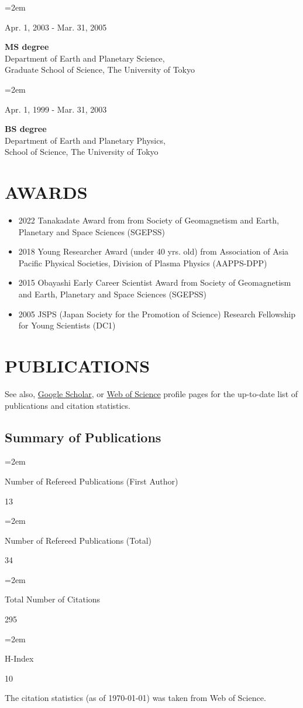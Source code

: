 \documentclass[lualatex,a4paper,ja=standard]{scrartcl}
\newcommand{\NewPart}[2]{\section*{\uppercase{#1} #2}}
\newcommand{\NewSubPart}[1]{\subsection*{#1}}
\newcommand{\GeneralEntry}[4]{
\noindent\hangindent=2em\hangafter=0
\parbox{#1}{#3}
\hspace{1em}
\parbox{#2}{#4} \par
\vspace{0.5em}
}
\begin{document}
\GeneralEntry{14em}{28em}{Apr. 1, 2003 - Mar. 31, 2005}
{\textbf{MS degree}\\
	Department of Earth and Planetary Science,\\
	Graduate School of Science, The University of Tokyo}


\GeneralEntry{14em}{28em}{Apr. 1, 1999 - Mar. 31, 2003}
{\textbf{BS degree}\\
	Department of Earth and Planetary Physics,\\
	School of Science, The University of Tokyo}


\NewPart{Awards}{}
\begin{itemize}
	\item 2022 Tanakadate Award from from Society of Geomagnetism and Earth, Planetary and Space Sciences (SGEPSS)
	\item 2018 Young Researcher Award (under 40 yrs. old) from Association of Asia Pacific Physical Societies, Division of Plasma Physics (AAPPS-DPP)
	\item 2015 Obayashi Early Career Scientist Award from Society of Geomagnetism and Earth, Planetary and Space Sciences (SGEPSS)
	\item 2005 JSPS (Japan Society for the Promotion of Science) Research Fellowship for Young Scientists (DC1)
\end{itemize}


\clearpage
\NewPart{Publications}{}

See also,
\href{https://scholar.google.co.jp/citations?hl=ja&user=o23rFB8AAAAJ&view_op=list_works&sortby=pubdate}{Google Scholar}, or
\href{https://www.webofscience.com/wos/author/record/G-4983-2014}{Web of Science} profile pages
for the up-to-date list of publications and citation statistics.

\ifWOS
	\NewSubPart{Summary of Publications}

	\GeneralEntry{28em}{8em}{Number of Refereed Publications (First Author)}{13}
	\GeneralEntry{28em}{8em}{Number of Refereed Publications (Total)}{34}
	\GeneralEntry{28em}{8em}{Total Number of Citations}{295}
	\GeneralEntry{28em}{8em}{H-Index}{10}

	The citation statistics (as of \today) was taken from Web of Science.
\fi

%

\end{document}
